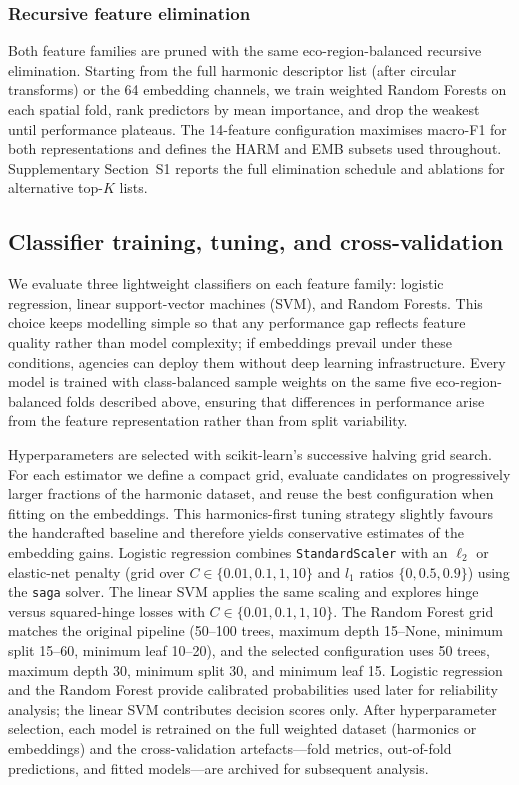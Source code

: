 \documentclass[utf8]{FrontiersinHarvard}
\begin{document}
\subsubsection{Recursive feature elimination}
\label{subsubsec:rfe}
Both feature families are pruned with the same eco-region-balanced recursive elimination. Starting from the full harmonic descriptor list (after circular transforms) or the 64 embedding channels, we train weighted Random Forests on each spatial fold, rank predictors by mean importance, and drop the weakest until performance plateaus. The 14-feature configuration maximises macro-F1 for both representations and defines the HARM and EMB subsets used throughout. Supplementary Section~S1 reports the full elimination schedule and ablations for alternative top-$K$ lists.

\subsection{Classifier training, tuning, and cross-validation}
We evaluate three lightweight classifiers on each feature family: logistic regression, linear support-vector machines (SVM), and Random Forests. This choice keeps modelling simple so that any performance gap reflects feature quality rather than model complexity; if embeddings prevail under these conditions, agencies can deploy them without deep learning infrastructure. Every model is trained with class-balanced sample weights on the same five eco-region-balanced folds described above, ensuring that differences in performance arise from the feature representation rather than from split variability.

Hyperparameters are selected with scikit-learn’s successive halving grid search. For each estimator we define a compact grid, evaluate candidates on progressively larger fractions of the harmonic dataset, and reuse the best configuration when fitting on the embeddings. This harmonics-first tuning strategy slightly favours the handcrafted baseline and therefore yields conservative estimates of the embedding gains. Logistic regression combines \texttt{StandardScaler} with an $\ell_2$ or elastic-net penalty (grid over $C\in\{0.01,0.1,1,10\}$ and $l_1$ ratios $\{0,0.5,0.9\}$) using the \texttt{saga} solver. The linear SVM applies the same scaling and explores hinge versus squared-hinge losses with $C\in\{0.01,0.1,1,10\}$. The Random Forest grid matches the original pipeline (50--100 trees, maximum depth 15--None, minimum split 15--60, minimum leaf 10--20), and the selected configuration uses 50 trees, maximum depth 30, minimum split 30, and minimum leaf 15. Logistic regression and the Random Forest provide calibrated probabilities used later for reliability analysis; the linear SVM contributes decision scores only. After hyperparameter selection, each model is retrained on the full weighted dataset (harmonics or embeddings) and the cross-validation artefacts—fold metrics, out-of-fold predictions, and fitted models—are archived for subsequent analysis.
\end{document}
